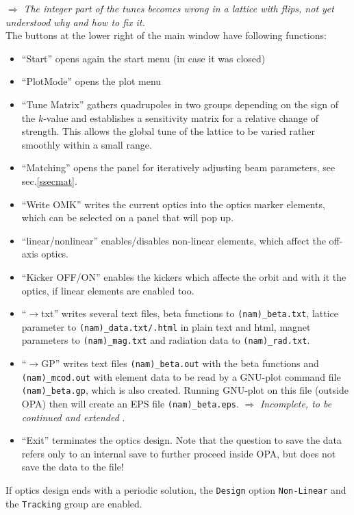 \documentclass[12pt]{article}
\newcommand\todo[1]{$\Longrightarrow$ {\em #1} }
\begin{document}
\todo{The integer part of the tunes becomes wrong in a lattice with flips, not yet understood why and how to fix it.}\\

The buttons at the lower right of the main window have following functions:
\begin{itemize}
\item ``Start'' opens again the start menu (in case it was closed)
\item ``PlotMode'' opens the plot menu
\item ``Tune Matrix'' gathers quadrupoles in two groups depending on the sign of the $k$-value and establishes a sensitivity matrix for a relative change of strength. This allows the global tune of the lattice to be varied rather smoothly within a small range.
\item ``Matching'' opens the panel for iteratively adjusting beam parameters, see sec.\ref{ssecmat}.
\item ``Write OMK'' writes the current optics into the optics marker elements, which can be selected on a panel that will pop up.
\item ``linear/nonlinear'' enables/disables non-linear elements, which affect the off-axis optics.
\item ``Kicker OFF/ON'' enables the kickers which affecte the orbit and with it the optics, if linear elements are enabled too.
\item ``$\rightarrow$txt'' writes several text files, beta functions to {\tt (nam)\_beta.txt}, lattice parameter to {\tt (nam)\_data.txt/.html} in plain text and html, magnet parameters to {\tt (nam)\_mag.txt} and radiation data to {\tt (nam)\_rad.txt}. 
\item  ``$\rightarrow$GP'' writes text files {\tt (nam)\_beta.out} with the beta functions
and {\tt (nam)\_mcod.out} with element data to be read by a GNU-plot command file {\tt (nam)\_beta.gp}, which is also created.
Running GNU-plot on this file (outside OPA) then will create an EPS file {\tt (nam)\_beta.eps}.
\todo{Incomplete, to be continued and extended}.
\item ``Exit'' terminates the optics design. Note that the question to save the
data refers only to an internal save to further proceed inside OPA, but does
not save the data to the file!
\end{itemize}

If optics design ends with a periodic solution, the {\tt Design} option {\tt Non-Linear} and the {\tt Tracking} 
group are enabled.\\
\end{document}
